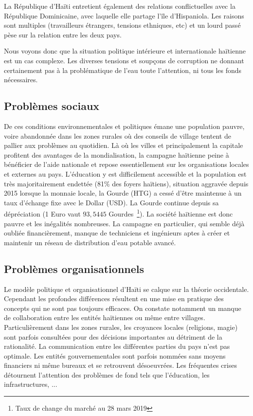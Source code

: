 \documentclass{eplmastersthesis_FR}
\begin{document}
				La République d'Haïti entretient également des relations conflictuelles avec la République Dominicaine, avec laquelle elle partage l'île d'Hispaniola. Les raisons sont multiples (travailleurs étrangers, tensions ethniques, etc) et un lourd passé pèse sur la relation entre les deux pays.

				Nous voyons donc que la situation politique intérieure et internationale haïtienne est un cas complexe. Les diverses tensions et soupçons de corruption ne donnant certainement pas à la problématique de l'eau toute l'attention, ni tous les fonds nécessaires.

			\subsection*{Problèmes sociaux}

				De ces conditions environnementales et politiques émane une population pauvre, voire abandonnée dans les zones rurales où des conseils de village tentent de pallier aux problèmes au quotidien. Là où les villes et principalement la capitale profitent des avantages de la mondialisation, la campagne haïtienne peine à bénéficier de l'aide nationale et repose essentiellement sur les organisations locales et externes au pays. L'éducation y est difficilement accessible et la population est très majoritairement endettée (81\% des foyers haïtiens), situation aggravée depuis 2015 lorsque la monnaie locale, la Gourde (HTG) a cessé d'être maintenue à un taux d'échange fixe avec le Dollar (USD). La Gourde continue depuis sa dépréciation (1 Euro vaut $93,5445$ Gourdes~\footnote{Taux de change du marché au 28 mars 2019}). La société haïtienne est donc pauvre et les inégalités nombreuses. La campagne en particulier, qui semble déjà oubliée financièrement, manque de techniciens et ingénieurs aptes à créer et maintenir un réseau de distribution d'eau potable avancé.

			\subsection*{Problèmes organisationnels}
				Le modèle politique et organisationnel d'Haïti se calque sur la théorie occidentale. Cependant les profondes différences résultent en une mise en pratique des concepts qui ne sont pas toujours efficaces.
				On constate notamment un manque de collaboration entre les entités haïtiennes ou même entre villages. Particulièrement dans les zones rurales, les croyances locales (religions, magie) sont parfois consultées pour des décisions importantes au détriment de la rationalité. La communication entre les différentes parties du pays n'est pas optimale. Les entités gouvernementales sont parfois nommées sans moyens financiers ni même bureaux et se retrouvent désoeuvrées. Les fréquentes crises détournent l'attention des problèmes de fond tels que l'éducation, les infrastructures, ...
\end{document}
